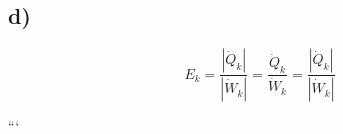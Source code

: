 

\subsection*{d)}

\[
E_k = \frac{|\dot{Q}_k|}{|\dot{W}_k|} = \frac{\dot{Q}_k}{\dot{W}_k} = \frac{|\dot{Q}_k|}{|\dot{W}_k|}
\]

```